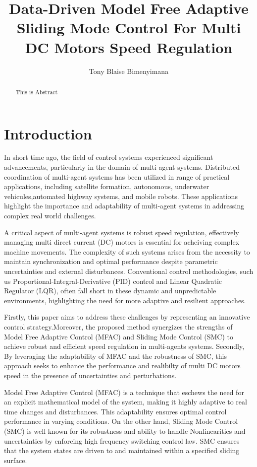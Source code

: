 \documentclass[journal,twocolumn]{IEEEtran}
\title{\LARGE Data-Driven Model Free Adaptive Sliding Mode Control For Multi DC Motors Speed Regulation}
\author{Tony Blaise Bimenyimana}
\begin{document}
\maketitle


\begin{abstract}
    This is Abstract
\end{abstract}

\section{Introduction}\label{section:1}

    In short time ago, the field of control systems experienced significant advancements, particularly in the domain of multi-agent systems. Distributed coordination of multi-agent systems has been utilized in range of practical applications, including satellite formation, autonomous, underwater vehicules,automated highway systems, and mobile robots. These applications highlight the importance and adaptability of multi-agent systems in addressing complex real world challenges.

    A critical aspect of multi-agent systems is robust speed regulation, effectively managing multi direct current (DC) motors is essential for acheiving complex machine movements. The complexity of such systems arises from the necessity to maintain synchronization and optimal performance despite parametric uncertainties and external disturbances. Conventional control methodologies, such us Proportional-Integral-Derivative (PID) control and Linear Quadratic Regulator (LQR), often fall short in these dynamic and unpredictable environments, highlighting the need for more adaptive and resilient approaches.

    Firstly, this paper aims to address these challenges by representing an innovative control strategy.Moreover, the proposed method synergizes the strengths of Model Free Adaptive Control (MFAC) and Sliding Mode Control (SMC) to achieve robust and efficient speed regulation in multi-agents systems. Secondly, By leveraging the adaptability of MFAC and the robustness of SMC, this approach seeks to enhance the performance and realibilty of multi DC motors speed in the presence of uncertainties and perturbations.

    Model Free Adaptive Control (MFAC) is a technique that eschews the need for an explicit mathematical model of the system, making it highly adaptive to real time changes and disturbances. This adaptability ensures optimal control performance in varying conditions. On the other hand, Sliding Mode Control (SMC) is well known for its robustness and ability to handle Nonlinearities and uncertainties by enforcing high frequency switching control law. SMC ensures that the system states are driven to and maintained within a specified sliding surface.
\end{document}
